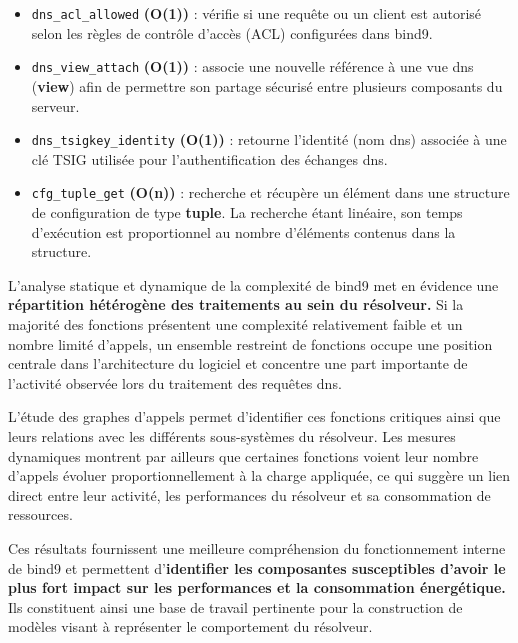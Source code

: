 \documentclass[12pt, a4paper]{report}
\begin{document}
	\begin{itemize}
		\item \texttt{dns\_acl\_allowed} \textbf{(O(1))} : vérifie si une requête ou un client est autorisé selon les règles de contrôle d'accès (ACL) configurées dans \gls{bind9}.
		
		\item \texttt{dns\_view\_attach} \textbf{(O(1))} : associe une nouvelle référence à une vue \gls{dns} (\textbf{view}) afin de permettre son partage sécurisé entre plusieurs composants du serveur.
		
		\item \texttt{dns\_tsigkey\_identity} \textbf{(O(1))} : retourne l'identité (nom \gls{dns}) associée à une clé TSIG utilisée pour l'authentification des échanges \gls{dns}.
		
		\item \texttt{cfg\_tuple\_get} \textbf{(O(n))} : recherche et récupère un élément dans une structure de configuration de type \textbf{tuple}. La recherche étant linéaire, son temps d'exécution est proportionnel au nombre d'éléments contenus dans la structure.
	\end{itemize}


	L'analyse statique et dynamique de la complexité de \gls{bind9} met en évidence une \textbf{répartition hétérogène des traitements au sein du résolveur.} Si la majorité des fonctions présentent une complexité relativement faible et un nombre limité d'appels, un ensemble restreint de fonctions occupe une position centrale dans l'architecture du logiciel et concentre une part importante de l'activité observée lors du traitement des requêtes \gls{dns}.

	L'étude des graphes d'appels permet d'identifier ces fonctions critiques ainsi que leurs relations avec les différents sous-systèmes du résolveur. Les mesures dynamiques montrent par ailleurs que certaines fonctions voient leur nombre d'appels évoluer proportionnellement à la charge appliquée, ce qui suggère un lien direct entre leur activité, les performances du résolveur et sa consommation de ressources.

	Ces résultats fournissent une meilleure compréhension du fonctionnement interne de \gls{bind9} et permettent d'\textbf{identifier les composantes susceptibles d'avoir le plus fort impact sur les performances et la consommation énergétique.} Ils constituent ainsi une base de travail pertinente pour la construction de modèles visant à représenter le comportement du résolveur.
\end{document}
